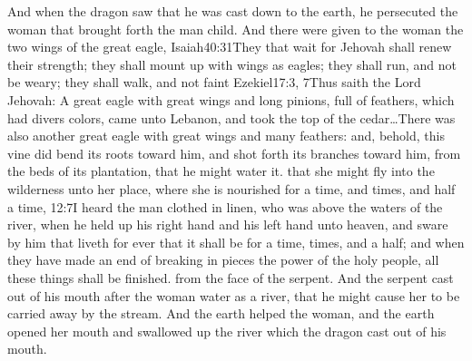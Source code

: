 And when the dragon saw that he was cast down to the earth, he persecuted the woman that brought forth the man child. 
And there were given to the woman the two wings of the great eagle,%
				   {Isaiah}{40:31}{They that wait for Jehovah shall renew their strength; they shall mount up with wings as eagles; they shall run, and not be weary; they shall walk, and not faint}%
				   {Ezekiel}{17:3, 7}{Thus saith the Lord Jehovah: A great eagle with great wings and long pinions, full of feathers, which had divers colors, came unto Lebanon, and took the top of the cedar\ldots There was also another great eagle with great wings and many feathers: and, behold, this vine did bend its roots toward him, and shot forth its branches toward him, from the beds of its plantation, that he might water it.} %
that she might fly into the wilderness unto her place, where she is nourished for a time, and times, and half a time,%
				    {12:7}{I heard the man clothed in linen, who was above the waters of the river, when he held up his right hand and his left hand unto heaven, and sware by him that liveth for ever that it shall be for a time, times, and a half; and when they have made an end of breaking in pieces the power of the holy people, all these things shall be finished.} %
from the face of the serpent. 
And the serpent cast out of his mouth after the woman water as a river, that he might cause her to be carried away by the stream. 
And the earth helped the woman, and the earth opened her mouth and swallowed up the river which the dragon cast out of his mouth.%
